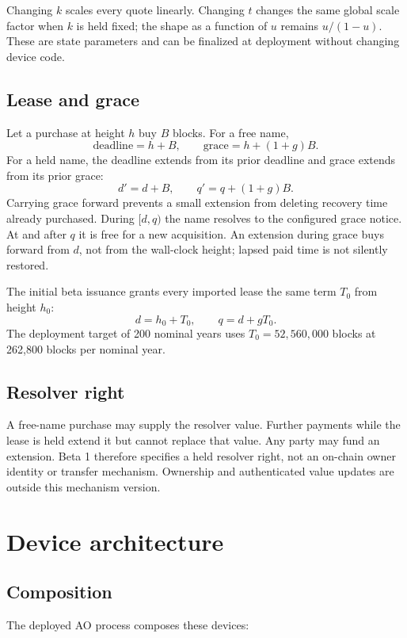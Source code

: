 \documentclass[10pt,twocolumn]{article}
\begin{document}
Changing $k$ scales every quote linearly. Changing $t$ changes the same global
scale factor when $k$ is held fixed; the shape as a function of $u$ remains
$u/(1-u)$. These are state parameters and can be finalized at deployment
without changing device code.

\subsection{Lease and grace}

Let a purchase at height $h$ buy $B$ blocks. For a free name,
\[
  \text{deadline}=h+B,
  \qquad
  \text{grace}=h+(1+g)B.
\]
For a held name, the deadline extends from its prior deadline and grace extends
from its prior grace:
\[
  d'=d+B,
  \qquad
  q'=q+(1+g)B.
\]
Carrying grace forward prevents a small extension from deleting recovery time
already purchased. During $[d,q)$ the name resolves to the configured grace
notice. At and after $q$ it is free for a new acquisition. An extension during
grace buys forward from $d$, not from the wall-clock height; lapsed paid time is
not silently restored.

The initial beta issuance grants every imported lease the same term $T_0$ from
height $h_0$:
\[
  d=h_0+T_0,
  \qquad
  q=d+gT_0.
\]
The deployment target of 200 nominal years uses $T_0=52{,}560{,}000$ blocks at
262,800 blocks per nominal year.

\subsection{Resolver right}

A free-name purchase may supply the resolver value. Further payments while the
lease is held extend it but cannot replace that value. Any party may fund an
extension. Beta 1 therefore specifies a held resolver right, not an on-chain
owner identity or transfer mechanism. Ownership and authenticated value updates
are outside this mechanism version.

\section{Device architecture}

\subsection{Composition}

The deployed AO process composes these devices:
\end{document}
